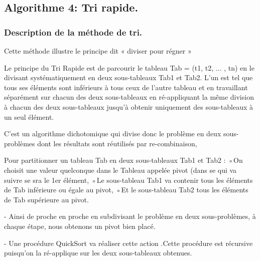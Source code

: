 \documentclass[12pt]{article}
\begin{document}
\subsection{Algorithme 4: Tri rapide.}
\subsubsection{Description de la méthode de tri.}
 Cette méthode illustre le principe dit « diviser pour régner »
 
Le principe du Tri Rapide est de parcourir le tableau Tab = (t1, t2, ... , tn) en le divisant systématiquement en deux sous-tableaux Tab1 et Tab2.
 L'un est tel que tous ses éléments sont inférieurs à tous ceux de l'autre tableau et en travaillant séparément sur chacun des deux sous-tableaux
 en ré-appliquant la même division à chacun des deux sous-tableaux jusqu'à obtenir uniquement des sous-tableaux à un seul élément.

 C'est un algorithme dichotomique qui divise donc le problème en deux sous-problèmes dont les résultats sont réutilisés par re-combinaison,

Pour partitionner un tableau Tab en deux sous-tableaux Tab1 et Tab2 :
◦On choisit une valeur quelconque dans le Tableau appelée pivot (dans se qui va suivre se sra le 1er élément,
◦Le sous-tableau Tab1 va contenir tous les éléments de Tab inférieure ou égale au pivot,
◦Et le sous-tableau Tab2 tous les éléments de Tab supérieure au pivot.

- Ainsi de proche en proche en subdivisant le problème en deux sous-problèmes, à chaque étape, nous obtenons un pivot bien placé.

- Une procédure QuickSort va réaliser cette action .Cette procédure est récursive puisqu'on la ré-applique sur les deux sous-tableaux obtenues.
 
\end{document}

